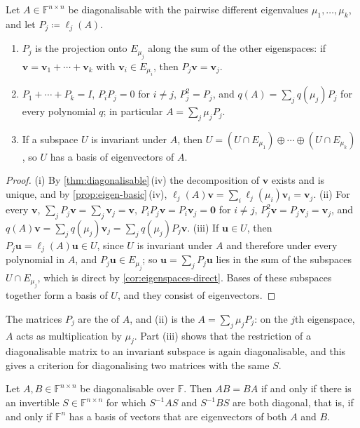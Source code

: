 \begin{lemma}
\label{lem:spectral-projections}
Let $A\in\mathbb F^{n\times n}$ be diagonalisable with the pairwise different eigenvalues $\mu_1,\ldots,\mu_k$, and let $P_j\coloneqq\ell_j(A)$.
\begin{enumerate}
\item $P_j$ is the projection onto $E_{\mu_j}$ along the sum of the other eigenspaces: if $\mathbf v=\mathbf v_1+\cdots+\mathbf v_k$ with $\mathbf v_i\in E_{\mu_i}$, then $P_j\mathbf v=\mathbf v_j$.
\item $P_1+\cdots+P_k=I$, $P_iP_j=0$ for $i\ne j$, $P_j^2=P_j$, and $q(A)=\sum_jq(\mu_j)P_j$ for every polynomial $q$; in particular $A=\sum_j\mu_jP_j$.
\item If a subspace $U$ is invariant under $A$, then $U=(U\cap E_{\mu_1})\oplus\cdots\oplus(U\cap E_{\mu_k})$, so $U$ has a basis of eigenvectors of $A$.
\end{enumerate}
\end{lemma}

\begin{proof}
(i) By \cref{thm:diagonalisable}\,(iv) the decomposition of $\mathbf v$ exists and is unique, and by \cref{prop:eigen-basic}\,(iv), $\ell_j(A)\mathbf v=\sum_i\ell_j(\mu_i)\mathbf v_i=\mathbf v_j$. (ii) For every $\mathbf v$, $\sum_jP_j\mathbf v=\sum_j\mathbf v_j=\mathbf v$, $P_iP_j\mathbf v=P_i\mathbf v_j=\mathbf 0$ for $i\ne j$, $P_j^2\mathbf v=P_j\mathbf v_j=\mathbf v_j$, and $q(A)\mathbf v=\sum_jq(\mu_j)\mathbf v_j=\sum_jq(\mu_j)P_j\mathbf v$. (iii) If $\mathbf u\in U$, then $P_j\mathbf u=\ell_j(A)\mathbf u\in U$, since $U$ is invariant under $A$ and therefore under every polynomial in $A$, and $P_j\mathbf u\in E_{\mu_j}$; so $\mathbf u=\sum_jP_j\mathbf u$ lies in the sum of the subspaces $U\cap E_{\mu_j}$, which is direct by \cref{cor:eigenspaces-direct}. Bases of these subspaces together form a basis of $U$, and they consist of eigenvectors.
\end{proof}

The matrices $P_j$ are the  of $A$, and (ii) is the  $A=\sum_j\mu_jP_j$: on the $j$th eigenspace, $A$ acts as multiplication by $\mu_j$. Part (iii) shows that the restriction of a diagonalisable matrix to an invariant subspace is again diagonalisable, and this gives a criterion for diagonalising two matrices with the same $S$.

\begin{theorem}
\label{thm:simultaneous}
Let $A,B\in\mathbb F^{n\times n}$ be diagonalisable over $\mathbb F$. Then $AB=BA$ if and only if there is an invertible $S\in\mathbb F^{n\times n}$ for which $S^{-1}AS$ and $S^{-1}BS$ are both diagonal, that is, if and only if $\mathbb F^n$ has a basis of vectors that are eigenvectors of both $A$ and $B$.
\end{theorem}

